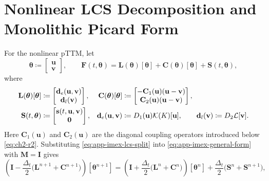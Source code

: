 \section{Nonlinear LCS Decomposition and Monolithic Picard Form}

For the nonlinear pTTM, let
\begin{equation}
    \boldsymbol{\theta}
    \coloneqq
    \begin{bmatrix}
        \mathbf{u} \\
        \mathbf{v}
    \end{bmatrix},
    \qquad
    \mathbf{F}(t,\boldsymbol{\theta})
    =
    \mathbf{L}(\boldsymbol{\theta})[\boldsymbol{\theta}]
    +
    \mathbf{C}(\boldsymbol{\theta})[\boldsymbol{\theta}]
    +
    \mathbf{S}(t,\boldsymbol{\theta}),
    \label{eq:app-imex-lcs-split}
\end{equation}
where
\begin{align}
    \mathbf{L}(\boldsymbol{\theta})[\boldsymbol{\theta}]
     & \coloneqq
    \begin{bmatrix}
        \mathbf{d}_e(\mathbf{u},\mathbf{v}) \\
        \mathbf{d}_l(\mathbf{v})
    \end{bmatrix},
     &
    \mathbf{C}(\boldsymbol{\theta})[\boldsymbol{\theta}]
     & \coloneqq
    \begin{bmatrix}
        - \mathbf{C}_1(\mathbf{u})(\mathbf{u}-\mathbf{v}) \\
        \mathbf{C}_2(\mathbf{u})(\mathbf{u}-\mathbf{v})
    \end{bmatrix},
    \notag                                                  \\
    \mathbf{S}(t,\boldsymbol{\theta})
     & \coloneqq
    \begin{bmatrix}
        \mathbf{s}(t,\mathbf{u},\mathbf{v}) \\
        \mathbf{0}
    \end{bmatrix},
     &
    \mathbf{d}_e(\mathbf{u},\mathbf{v})
     & \coloneqq D_1(\mathbf{u})\mathcal{K}(K)[\mathbf{u}],
    \qquad
    \mathbf{d}_l(\mathbf{v}) \coloneqq D_2 \mathcal{L}[\mathbf{v}].
    \label{eq:app-imex-lcs-operators}
\end{align}
Here \(\mathbf{C}_1(\mathbf{u})\) and \(\mathbf{C}_2(\mathbf{u})\) are the diagonal coupling operators introduced below \eqref{eq:ch2-r2}. Substituting \eqref{eq:app-imex-lcs-split} into \eqref{eq:app-imex-general-form} with \(\mathbf{M}=\mathbf{I}\) gives
\begin{equation}
    \left(
    \mathbf{I}
    -
    \frac{\Delta_t}{2}
    \bigl(
    \mathbf{L}^{n+1}
    +
    \mathbf{C}^{n+1}
    \bigr)
    \right)
    [\boldsymbol{\theta}^{n+1}]
    =
    \left(
    \mathbf{I}
    +
    \frac{\Delta_t}{2}
    \bigl(
    \mathbf{L}^{n}
    +
    \mathbf{C}^{n}
    \bigr)
    \right)
    [\boldsymbol{\theta}^{n}]
    +
    \frac{\Delta_t}{2}
    \bigl(
    \mathbf{S}^{n}
    +
    \mathbf{S}^{n+1}
    \bigr),
    \label{eq:app-imex-monolithic-cn}
\end{equation}
